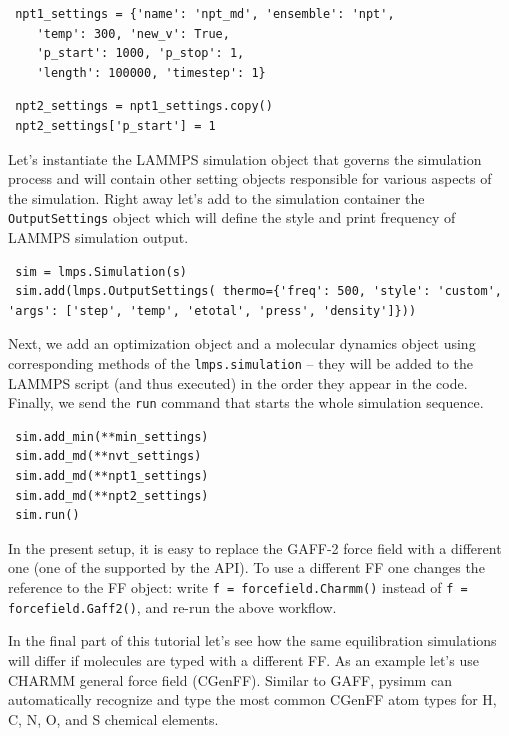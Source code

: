 \documentclass[9pt,tutorial]{livecoms}
\begin{document}
\begin{lstlisting}
 npt1_settings = {'name': 'npt_md', 'ensemble': 'npt',
    'temp': 300, 'new_v': True,
    'p_start': 1000, 'p_stop': 1,
    'length': 100000, 'timestep': 1}
\end{lstlisting}

\begin{lstlisting}
 npt2_settings = npt1_settings.copy()
 npt2_settings['p_start'] = 1
\end{lstlisting}

Let's instantiate the LAMMPS simulation object that governs the simulation process and will contain other setting objects responsible for various aspects of the simulation. Right away let's add to the simulation container the \lstinline$OutputSettings$ object which will define the style and print frequency of LAMMPS simulation output. 

\begin{lstlisting}
 sim = lmps.Simulation(s)
 sim.add(lmps.OutputSettings( thermo={'freq': 500, 'style': 'custom', 
'args': ['step', 'temp', 'etotal', 'press', 'density']}))
\end{lstlisting}

Next, we add an optimization object and a molecular dynamics object using corresponding methods of the \lstinline$lmps.simulation$ -- they will be added to the LAMMPS script (and thus executed) in the order they appear in the code. Finally, we send the \lstinline$run$ command that starts the whole simulation sequence.

\begin{lstlisting}
 sim.add_min(**min_settings)
 sim.add_md(**nvt_settings)
 sim.add_md(**npt1_settings)
 sim.add_md(**npt2_settings)
 sim.run()
\end{lstlisting}

In the present setup, it is easy to replace the GAFF-2 force field with a different one (one of the supported by the API). To use a different FF one changes the reference to the FF object: write \lstinline$f = forcefield.Charmm()$ instead of \lstinline$f = forcefield.Gaff2()$, and re-run the above workflow.

In the final part of this tutorial let's see how the same equilibration simulations will differ if molecules are typed with a different FF. As an example let's use CHARMM general force field (CGenFF). Similar to GAFF, pysimm can automatically recognize and type the most common CGenFF atom types for H, C, N, O, and S chemical elements.
\end{document}
